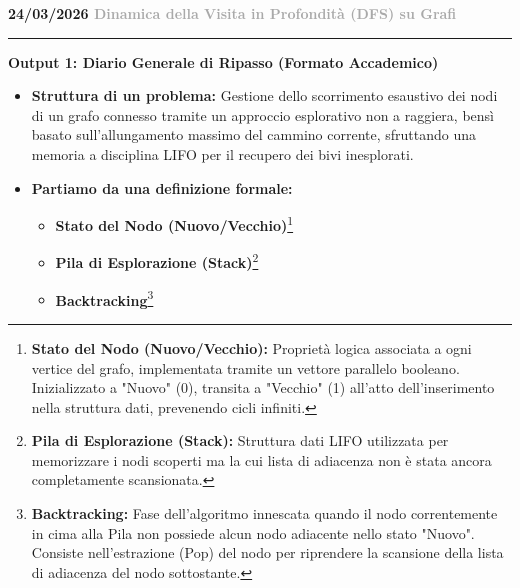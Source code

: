 \documentclass[a4paper, 11pt]{report}
\newcommand{\lezione}[2]{
\vspace{2em}
\noindent\textbf{\Large #1 \hfill \textcolor{darkgray}{#2}}
\vspace{0.5em}
\hrule
\vspace{1.5em}
}
\newcommand{\definizione}[2]{%
\textbf{#1}\footnote{\textbf{#1:} #2}%
}
\begin{document}
\lezione{24/03/2026}{Dinamica della Visita in Profondità (DFS) su Grafi}
\vspace{0.5cm}
\textbf{Output 1: Diario Generale di Ripasso (Formato Accademico)}
\begin{itemize}
\item \textbf{Struttura di un problema:}
Gestione dello scorrimento esaustivo dei nodi di un grafo connesso tramite un approccio esplorativo non a raggiera, bensì basato sull'allungamento massimo del cammino corrente, sfruttando una memoria a disciplina LIFO per il recupero dei bivi inesplorati.

\item \textbf{Partiamo da una definizione formale:}
\begin{itemize}
    \item \definizione{Stato del Nodo (Nuovo/Vecchio)}{Proprietà logica associata a ogni vertice del grafo, implementata tramite un vettore parallelo booleano. Inizializzato a "Nuovo" (0), transita a "Vecchio" (1) all'atto dell'inserimento nella struttura dati, prevenendo cicli infiniti.}
    \item \definizione{Pila di Esplorazione (Stack)}{Struttura dati LIFO utilizzata per memorizzare i nodi scoperti ma la cui lista di adiacenza non è stata ancora completamente scansionata.}
    \item \definizione{Backtracking}{Fase dell'algoritmo innescata quando il nodo correntemente in cima alla Pila non possiede alcun nodo adiacente nello stato "Nuovo". Consiste nell'estrazione (Pop) del nodo per riprendere la scansione della lista di adiacenza del nodo sottostante.}
\end{itemize}


\end{itemize}
\end{document}

